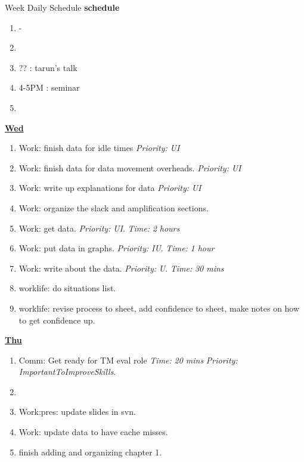 \documentclass[serif, mathserif, final]{beamer}
\newcommand{\timeEst}[1]{\textit{Time:} \textit{#1}}
\newcommand{\priority}[1]{\textit{Priority:} \textit{#1}}
\begin{document}
\begin{frame}{}
\begin{columns}
\begin{column}{0.50\linewidth}
\begin{block}{Week Daily Schedule}
  \textbf{schedule} 
  \begin{enumerate} 
    \tiny \item \tiny - 
    \item \tiny 
    \item \tiny  ?? : tarun's talk 
    \item \tiny 4-5PM : seminar 
    \item \tiny 
  \end{enumerate} 

  \textbf{\small {\underline{Wed}}}
  \begin{enumerate} 
    \tiny \item \tiny Work: finish data for idle times \priority{UI} 
  \item \tiny Work: finish data for data movement overheads. \priority{UI} 
  \item \tiny Work: write up explanations for data \priority{UI} 
  \item \tiny Work: organize the slack and amplification sections. 
    \tiny \item \tiny Work: get data. \priority{UI}. \timeEst{2 hours} 
  \item \tiny Work: put data in graphs. \priority{IU}. \timeEst{1 hour}
  \item \tiny Work: write about the data. \priority{U}. \timeEst{30 mins} 
  \item \tiny worklife: do situations list. 
  \item \tiny worklife: revise process to sheet, add confidence to sheet, make notes on how to get confidence up.  
  \end{enumerate} 

  \textbf{\small{\underline{Thu}}}
  \begin{enumerate}
    \tiny \item \tiny Comm: Get ready for TM eval role \timeEst{20 mins} \priority{ImportantToImproveSkills}.
  \item \tiny \item Work:pres: update slides in svn.
  \item \tiny Work: update data to have cache misses. 

    \tiny \item \tiny finish adding and organizing chapter 1.  
    

\end{enumerate}
\end{block}
\end{column}
\end{columns}
\end{frame}
\end{document}
